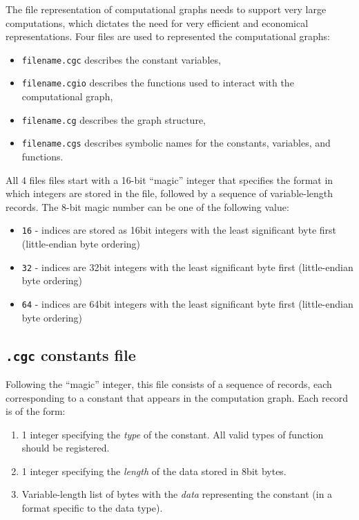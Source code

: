 \documentclass[11pt]{article}
\begin{document}
The file representation of computational graphs needs to support very
large computations, which dictates the need for very efficient and
economical representations. Four files are used to represented the
computational graphs:
\begin{itemize}
\item \texttt{filename.cgc} describes the constant variables,
\item \texttt{filename.cgio} describes the functions used to interact
  with the computational graph,
\item \texttt{filename.cg} describes the graph structure,
\item \texttt{filename.cgs} describes symbolic names for the
  constants, variables, and functions.
\end{itemize}
All 4 files files start with a 16-bit ``magic'' integer that specifies
the format in which integers are stored in the file, followed by a
sequence of variable-length records. The 8-bit magic number can be
one of the following value:
\begin{itemize}
\item \texttt{16} - indices are stored as 16bit integers with the least
  significant byte first (little-endian byte ordering)
\item \texttt{32} - indices are 32bit integers  with the least
  significant byte first (little-endian byte ordering)
\item \texttt{64} - indices are 64bit integers with the least
  significant byte first (little-endian byte ordering)
\end{itemize}

\subsection{\texttt{.cgc} constants file}

Following the ``magic'' integer, this file consists of a sequence of
records, each corresponding to a constant that appears in the
computation graph. Each record is of the form:
\begin{enumerate}
\item 1 integer specifying the \emph{type} of the constant. All valid types of function should be registered.

\item 1 integer specifying the \emph{length} of the data stored in 8bit bytes.
\item Variable-length list of bytes with the \emph{data} representing
  the constant (in a format specific to the data type).
\end{enumerate}
\end{document}
